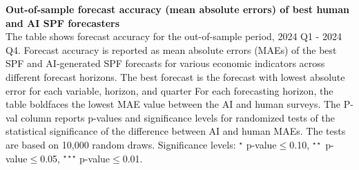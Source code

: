 \documentclass[11pt,letterpaper]{scrartcl}
\begin{document}
\begin{table}[h!]
    \centering
    \scriptsize{
    
    }
    \caption{
    \textbf{Out-of-sample forecast accuracy (mean absolute errors) of SPF and AI-generated SPF forecasts}
    \vspace{10pt}\\
    \vspace{10pt}\\
    \footnotesize{The table shows forecast accuracy for the out-of-sample period, 2024 Q1 - 2024 Q4. Forecast accuracy is reported as mean absolute errors (MAEs) of SPF and AI-generated SPF forecasts for various economic indicators across different forecast horizons. For each forecasting horizon, the table boldfaces the lowest MAE value between the AI and human surveys. The P-val column reports p-values and significance levels for randomized tests of the statistical significance of the difference between AI and human MAEs. The tests are based on 10,000 random draws. Significance levels: $^{\star}$ p-value$\leq$0.10, $^{\star\star}$ p-value$\leq$0.05, $^{\star\star\star}$ p-value$\leq$0.01.
}}
    \label{tab:MAEs_forecastaccuracy_oos}
\end{table}
\clearpage

\begin{table}[h!]
    \centering
    \footnotesize{
    
    }
    \caption{
    \textbf{Out-of-sample forecast accuracy (mean absolute errors) of best human and AI SPF forecasters}
    \vspace{10pt}\\
    \footnotesize{The table shows forecast accuracy for the out-of-sample period, 2024 Q1 - 2024 Q4. Forecast accuracy is reported as mean absolute errors (MAEs) of the best SPF and AI-generated SPF forecasts for various economic indicators across different forecast horizons. The best forecast is the forecast with lowest absolute error for each variable, horizon, and quarter For each forecasting horizon, the table boldfaces the lowest MAE value between the AI and human surveys. The P-val column reports p-values and significance levels for randomized tests of the statistical significance of the difference between AI and human MAEs. The tests are based on 10,000 random draws. Significance levels: $^{\star}$ p-value$\leq$0.10, $^{\star\star}$ p-value$\leq$0.05, $^{\star\star\star}$ p-value$\leq$0.01.
}}
    \label{tab:MAEs_forecastaccuracy_oos_best}
\end{table}
\end{document}
